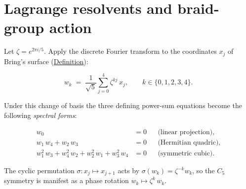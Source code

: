 \section{Lagrange resolvents and braid-group action}
\label{sec:resolvents-braid}

\begin{remark}
  \label{rem:lagrange-resolvents}
Let $\zeta=e^{2\pi i/5}$.  Apply the discrete Fourier transform to the
coordinates $x_j$ of Bring's surface
(\hyperref[def:brings-surface]{Definition}):

\[
w_k \;=\; \frac{1}{\sqrt{5}}\sum_{j=0}^{4}\zeta^{kj}\,x_j,
  \qquad k\in\{0,1,2,3,4\}.
\]

Under this change of basis the three defining power-sum equations become the
following \emph{spectral forms}:

\begin{align}
  w_0 &= 0
    &&\text{(linear projection),}
    \label{eq:resolvent-linear}\\[4pt]
  w_1\,w_4+w_2\,w_3 &= 0
    &&\text{(Hermitian quadric),}
    \label{eq:resolvent-quadric}\\[4pt]
  w_1^2\,w_3+w_4^2\,w_2+w_2^2\,w_1+w_3^2\,w_4 &= 0
    &&\text{(symmetric cubic).}
    \label{eq:resolvent-cubic}
\end{align}

The cyclic permutation $\sigma\colon x_j\mapsto x_{j+1}$ acts by
$\sigma(w_k)=\zeta^{-k}w_k$, so the $C_5$ symmetry is manifest as a phase
rotation $w_k\mapsto\zeta^k\,w_k$.
\end{remark}

